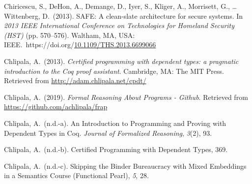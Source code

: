 \documentclass[12pt,twoside]{article}
\begin{document}
{\begin{thebibliography}{1079}
\mdbibitemlabel{}Chiricescu, S., DeHon, A., Demange, D., Iyer, S., Kliger, A., Morrisett, G., … Wittenberg, D.~(2013). SAFE: A clean-slate architecture for secure systems. In \emph{2013 IEEE International Conference on Technologies for Homeland Security (HST)} (pp. 570–576). Waltham, MA, USA: IEEE.~https://doi.org/\href{https://dx.doi.org/10.1109/THS.2013.6699066}{10.1109/THS.2013.6699066}%

\mdbibitemlabel{}Chlipala, A.~(2013). \emph{Certified programming with dependent types: a pragmatic introduction to the Coq proof assistant}. Cambridge, MA: The MIT Press. Retrieved from \href{http://adam.chlipala.net/cpdt/}{{\ttfamily http://\hspace{0pt}adam.\hspace{0pt}chlipala.\hspace{0pt}net/\hspace{0pt}cpdt/\hspace{0pt}}}%

\mdbibitemlabel{}Chlipala, A.~(2019). \emph{Formal Reasoning About Programs - Github}. Retrieved from \href{https://github.com/achlipala/frap}{{\ttfamily https://\hspace{0pt}github.\hspace{0pt}com/\hspace{0pt}achlipala/\hspace{0pt}frap}}%

\mdbibitemlabel{}Chlipala, A.~(n.d.-a). An Introduction to Programming and Proving with Dependent Types in Coq. \emph{Journal of Formalized Reasoning}, \emph{3}(2), 93.%

\mdbibitemlabel{}Chlipala, A.~(n.d.-b). Certiﬁed Programming with Dependent Types, 369.%

\mdbibitemlabel{}Chlipala, A.~(n.d.-c). Skipping the Binder Bureaucracy with Mixed Embeddings in a Semantics Course (Functional Pearl), \emph{5}, 28.%


\end{thebibliography}}
\end{document}

